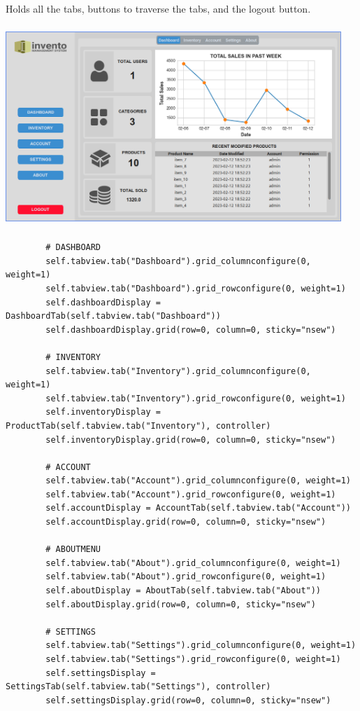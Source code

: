 \documentclass[12pt,a4paper]{article}
\renewcommand{\indent}{\hspace\parindent}
\begin{document}
            \indent Holds all the tabs, buttons to traverse the tabs, and the 
            logout button.

            \begin{center}
                \includegraphics[width=5in,height=3in]{light.png}
            \end{center}

            \begin{lstlisting}
        # DASHBOARD
        self.tabview.tab("Dashboard").grid_columnconfigure(0, weight=1)
        self.tabview.tab("Dashboard").grid_rowconfigure(0, weight=1)
        self.dashboardDisplay = DashboardTab(self.tabview.tab("Dashboard"))
        self.dashboardDisplay.grid(row=0, column=0, sticky="nsew")

        # INVENTORY
        self.tabview.tab("Inventory").grid_columnconfigure(0, weight=1)
        self.tabview.tab("Inventory").grid_rowconfigure(0, weight=1)
        self.inventoryDisplay = ProductTab(self.tabview.tab("Inventory"), controller)
        self.inventoryDisplay.grid(row=0, column=0, sticky="nsew")

        # ACCOUNT
        self.tabview.tab("Account").grid_columnconfigure(0, weight=1)
        self.tabview.tab("Account").grid_rowconfigure(0, weight=1)
        self.accountDisplay = AccountTab(self.tabview.tab("Account"))
        self.accountDisplay.grid(row=0, column=0, sticky="nsew")

        # ABOUTMENU
        self.tabview.tab("About").grid_columnconfigure(0, weight=1)
        self.tabview.tab("About").grid_rowconfigure(0, weight=1)
        self.aboutDisplay = AboutTab(self.tabview.tab("About"))
        self.aboutDisplay.grid(row=0, column=0, sticky="nsew")
        
        # SETTINGS
        self.tabview.tab("Settings").grid_columnconfigure(0, weight=1)
        self.tabview.tab("Settings").grid_rowconfigure(0, weight=1)
        self.settingsDisplay = SettingsTab(self.tabview.tab("Settings"), controller)
        self.settingsDisplay.grid(row=0, column=0, sticky="nsew")
            \end{lstlisting}
\end{document}
